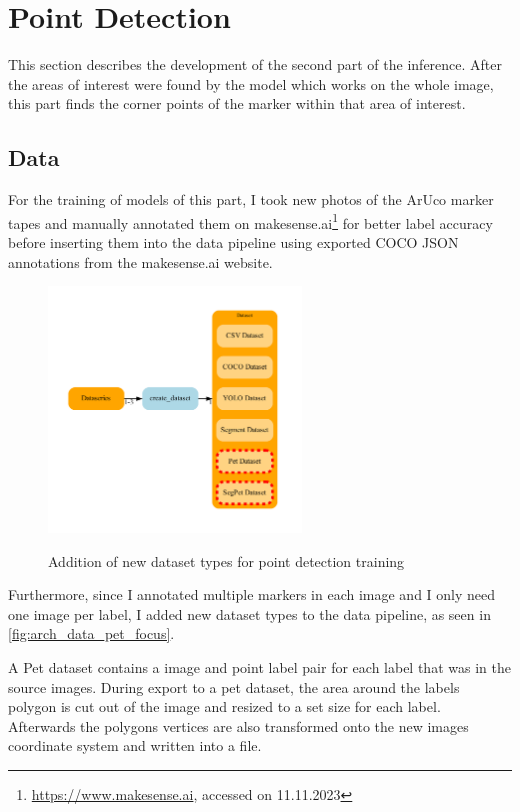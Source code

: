 \documentclass[10pt]{book}
\begin{document}
\section{Point Detection}

This section describes the development of the second part of the inference. After the areas of interest were found by the model which works on the whole image, this part finds the corner points of the marker within that area of interest.

\subsection{Data}

For the training of models of this part, I took new photos of the \ac{ArUco} marker tapes and manually annotated them on makesense.ai\footnote{\url{https://www.makesense.ai}, accessed on 11.11.2023} for better label accuracy before inserting them into the data pipeline using exported \ac{COCO} \ac{JSON} annotations from the makesense.ai website.

\begin{figure}
  \caption{Addition of new dataset types for point detection training}
  \includegraphics[width=0.6\textwidth]{graph/arch_data_pet_focus}
  \label{fig:arch_data_pet_focus}
\end{figure}

Furthermore, since I annotated multiple markers in each image and I only need one image per label, I added new dataset types to the data pipeline, as seen in \autoref{fig:arch_data_pet_focus}. 

A Pet dataset contains a image and point label pair for each label that was in the source images. During export to a pet dataset, the area around the labels polygon is cut out of the image and resized to a set size for each label. Afterwards the polygons vertices are also transformed onto the new images coordinate system and written into a file. 
\end{document}
